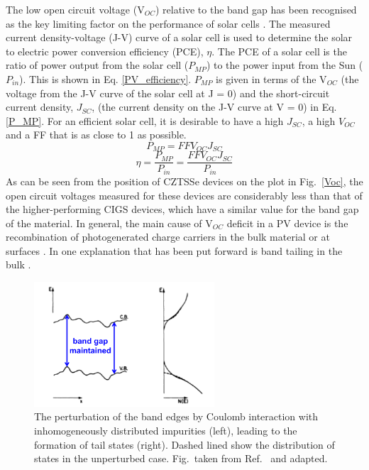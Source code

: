 \documentclass[11pt, twoside]{report}
\begin{document}
The low open circuit voltage (V$_{OC}$) relative to the band gap has been recognised as the key limiting factor on the performance of {\CZTS} solar cells \cite{culprit}. 
The measured current density-voltage (J-V) curve of a solar cell is used to determine the solar to electric power conversion efficiency (PCE), $\eta$. The PCE of a solar cell is the ratio of power output from the solar cell ($P_{MP}$) to the power input from the Sun ($P_{in}$). This is shown in Eq. \ref{PV_efficiency}. $P_{MP}$ is given in terms of the V$_{OC}$ (the voltage from the J-V curve of the solar cell at J = 0) and the short-circuit current density, $J_{SC}$, (the current density on the J-V curve at V = 0) in Eq. \ref{P_MP}.
For an efficient solar cell, it is desirable to have a high $J_{SC}$, a high $V_{OC}$ and a FF that is as close to 1 as possible.
\begin{equation} \label{P_MP}
P_{MP} = FFV_{OC}J_{SC}
\end{equation}
\begin{equation} \label{PV_efficiency}
\eta = \frac{P_{MP}}{P_{in}} = \frac{FFV_{OC}J_{SC}}{P_{in}}
\end{equation}
As can be seen from the position of CZTSSe devices on the plot in Fig.~\ref{Voc}, the open circuit voltages measured for these devices are considerably less than that of the higher-performing CIGS devices, which have a similar value for the band gap of the material.
In general, the main cause of V$_{OC}$ deficit in a PV device is the recombination of photogenerated charge carriers in the bulk material or at surfaces \cite{culprit}. In {\CZTS} one explanation that has been put forward is band tailing in the bulk \cite{band_tail}.


\begin{figure}[h!]
  \centering
    \includegraphics[width=0.6\textwidth]{figures/pankove_elec_fluc.png}
    \caption[The perturbation of the band edges by Coulomb interaction with inhomogeneously distributed impurities (left), leading to the formation of tail states (right). Dashed lined show the distribution of states in the unperturbed case]{The perturbation of the band edges by Coulomb interaction with inhomogeneously distributed impurities (left), leading to the formation of tail states (right). Dashed lined show the distribution of states in the unperturbed case. Fig.~taken from Ref.~ and adapted.}
  \label{pankove_elec_fluc}
\end{figure}
\end{document}
